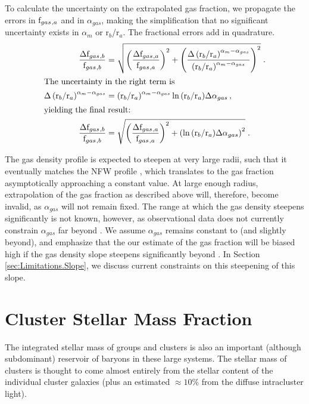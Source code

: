 To calculate the uncertainty on the extrapolated gas fraction, we
propagate the errors in $\textrm{f\ensuremath{_{gas}}}{}_{,a}$ and in $\alpha_{gas}$, making the
simplification that no significant uncertainty exists in $\alpha_m$ or
r$_b$/r$_a$. The fractional errors add in quadrature.
\begin{align}
\frac{\Delta\textrm{f\ensuremath{_{gas}}}{}_{,b}}{\textrm{f\ensuremath{_{gas}}}{}_{,b}} &=
\sqrt{\left(\frac{\Delta\textrm{f\ensuremath{_{gas}}}{}_{,a}}{\textrm{f\ensuremath{_{gas}}}{}_{,a}}\right)^2 +
  \left(\frac{\Delta\left(\textrm{r}_b/\textrm{r}_a\right)^{\alpha_m-\alpha_{gas}}}{\left(\textrm{r}_b/\textrm{r}_a\right)^{\alpha_m-\alpha_{gas}}}\right)^2}\;.\\
\intertext{The uncertainty in the right term is}
\Delta\left(\textrm{r}_b/\textrm{r}_a\right)^{\alpha_m-\alpha_{gas}}
& =
\left(\textrm{r}_b/\textrm{r}_a\right)^{\alpha_m-\alpha_{gas}}\ln{\left(\textrm{r}_b/\textrm{r}_a\right)}\Delta\alpha_{gas}\,,\\
\intertext{yielding the final result:}
\frac{\Delta\textrm{f\ensuremath{_{gas}}}{}_{,b}}{\textrm{f\ensuremath{_{gas}}}{}_{,b}} &=
\sqrt{\left(\frac{\Delta\textrm{f\ensuremath{_{gas}}}{}_{,a}}{\textrm{f\ensuremath{_{gas}}}{}_{,a}}\right)^2 +
  \left(\ln{\left(\textrm{r}_b/\textrm{r}_a\right)}\Delta\alpha_{gas}\right)^2}\;.
\end{align}

The gas density profile is expected to steepen at very large radii,
such that it eventually matches the NFW profile ,
which translates to the gas fraction asymptotically approaching a
constant value. At large enough radius, extrapolation of the gas
fraction as described above will, therefore, become invalid, as
$\alpha_{gas}$ will not remain fixed. The range at which the gas
density steepens significantly is not known, however, as observational
data does not currently constrain $\alpha_{gas}$ far beyond
\rtwo{}. We assume $\alpha_{gas}$ remains constant to
\rvir{} (and slightly beyond), and emphasize that the our estimate
of the gas fraction will be biased high if the gas density slope
steepens significantly beyond \rtwo{}. In Section
\ref{sec:Limitations.Slope}, we discuss current constraints on this
steepening of this slope.

\section{Cluster Stellar Mass Fraction}
\label{sec:Stellar}

The integrated stellar mass of groups and clusters is also an
important (although subdominant) reservoir of baryons in these large
systems. The stellar mass of clusters is thought to come almost entirely
from the stellar content of the individual cluster galaxies (plus an
estimated $\approx10\%$ from the diffuse intracluster light).

